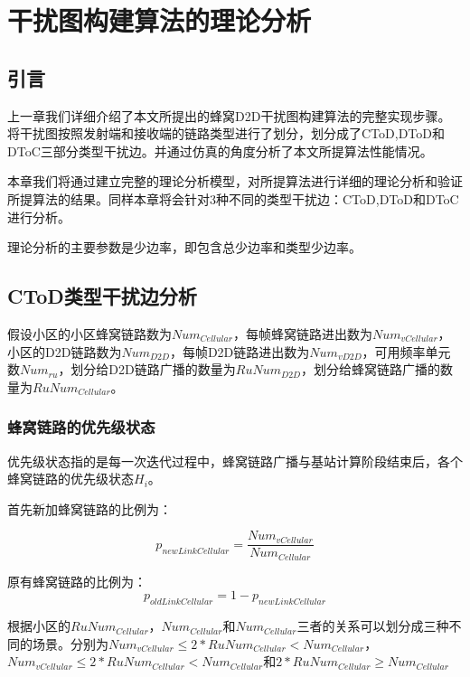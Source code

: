 \documentclass[figurelist,tablelist,algorithmlist,nomlist,masters]{seuthesix}
\begin{document}
	\chapter{干扰图构建算法的理论分析}
	\section{引言}
	上一章我们详细介绍了本文所提出的蜂窝D2D干扰图构建算法的完整实现步骤。将干扰图按照发射端和接收端的链路类型进行了划分，划分成了CToD,DToD和DToC三部分类型干扰边。并通过仿真的角度分析了本文所提算法性能情况。
	
	本章我们将通过建立完整的理论分析模型，对所提算法进行详细的理论分析和验证所提算法的结果。同样本章将会针对3种不同的类型干扰边：CToD,DToD和DToC进行分析。
	
	理论分析的主要参数是少边率，即包含总少边率和类型少边率。
	
	\section{CToD类型干扰边分析}
	假设小区的小区蜂窝链路数为$Nu{m_{Cellular}}$，每帧蜂窝链路进出数为$Nu{m_{vCellular}}$，小区的D2D链路数为$Nu{m_{D2D}}$，每帧D2D链路进出数为$Nu{m_{vD2D}}$，可用频率单元数$Nu{m_{ru}}$，划分给D2D链路广播的数量为$RuNu{m_{D2D}}$，划分给蜂窝链路广播的数量为$RuNu{m_{Cellular}}$。
	
	\subsection{蜂窝链路的优先级状态}
	优先级状态指的是每一次迭代过程中，蜂窝链路广播与基站计算阶段结束后，各个蜂窝链路的优先级状态${H_i}$。
	
	首先新加蜂窝链路的比例为：
	
	\begin{equation}\label{eq3.1}
	{p_{newLinkCellular}} = \frac{{Nu{m_{vCellular}}}}{{Nu{m_{Cellular}}}}
	\end{equation}
	
	原有蜂窝链路的比例为：
	\begin{equation}\label{eq3.1}
	{p_{oldLinkCellular}} = 1 - {p_{newLinkCellular}}
	\end{equation}
	
	根据小区的$RuNu{m_{Cellular}}$，$Nu{m_{Cellular}}$和$Nu{m_{Cellular}}$三者的关系可以划分成三种不同的场景。分别为$Nu{m_{vCellular}} \le 2*RuNu{m_{Cellular}} < Nu{m_{Cellular}}$，$Nu{m_{vCellular}} \le 2*RuNu{m_{Cellular}} < Nu{m_{Cellular}}$和$2*RuNu{m_{Cellular}} \ge Nu{m_{Cellular}}$
	
\end{document}
